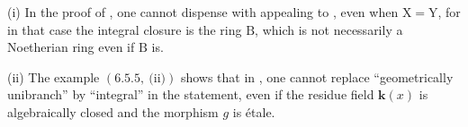 \begin{remarks}[6.15.11]
\label{IV.6.15.11}
(i) In the proof of , one cannot dispense with
appealing to , even when $\mathrm{X}=\mathrm{Y}$, for in that case the integral
closure is the ring $\mathrm{B}$, which is not necessarily a Noetherian ring even if $\mathrm{B}$
is.

(ii) The example $(6.5.5,~\text{(ii)})$ shows that in , one cannot replace
``geometrically unibranch'' by ``integral'' in the statement, even if the residue field
$\boldsymbol{k}(x)$ is algebraically closed and the morphism $g$ is \'etale.
\end{remarks}
